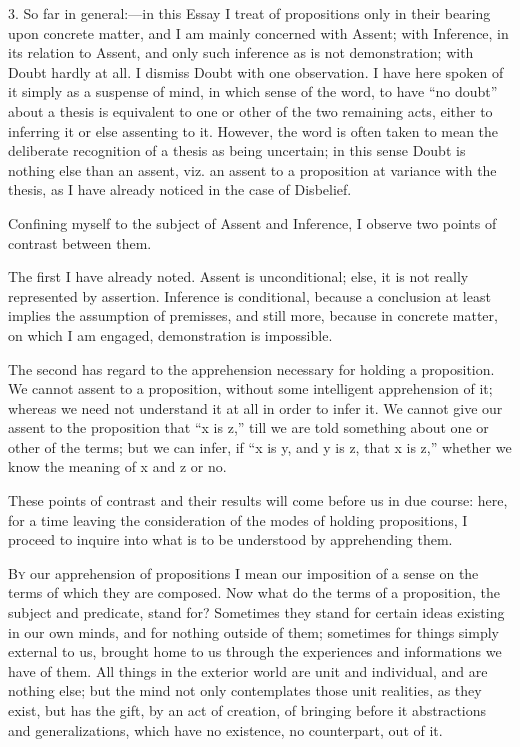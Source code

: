 3. So far in general:—in this Essay I treat of propositions only
in their bearing upon concrete matter, and I am mainly concerned with
Assent; with Inference, in its relation to Assent, and only such
inference as is not demonstration; with Doubt hardly at all. I dismiss
Doubt with one observation. I have here spoken of it simply as a
suspense of mind, in which sense of the word, to have ``no
doubt'' about a thesis is equivalent to one or other of the two
remaining acts, either to inferring it or else assenting to it.
However, the word is often taken to mean the deliberate recognition of
a thesis as being uncertain; in this sense Doubt is nothing else
than an assent, viz. an assent to a proposition at variance with the
thesis, as I have already noticed in the case of Disbelief.

Confining myself to the subject of Assent and Inference, I observe
two points of contrast between them.

The first I have already noted. Assent is unconditional; else, it
is not really represented by assertion. Inference is conditional,
because a conclusion at least implies the assumption of premisses, and
still more, because in concrete matter, on which I am engaged,
demonstration is impossible.

The second has regard to the apprehension necessary for holding a
proposition. We cannot assent to a proposition, without some
intelligent apprehension of it; whereas we need not understand it at
all in order to infer it. We cannot give our assent to the proposition
that ``x is z,'' till we are told something about one or other
of the terms; but we can infer, if ``x is y, and y is z, that x is
z,'' whether we know the meaning of x and z or no.

These points of contrast and their results will come before us in
due course: here, for a time leaving the consideration of the modes of
holding propositions, I proceed to inquire into what is to be
understood by apprehending them.


B\textsc{y} our apprehension of propositions I mean our imposition of a
sense on the terms of which they are composed. Now what do the terms
of a proposition, the subject and predicate, stand for? Sometimes they
stand for certain ideas existing in our own minds, and for nothing
outside of them; sometimes for things simply external to us, brought
home to us through the experiences and informations we have of them.
All things in the exterior world are unit and individual, and are
nothing else; but the mind not only contemplates those unit realities,
as they exist, but has the gift, by an act of creation, of bringing
before it abstractions and generalizations, which have no existence,
no counterpart, out of it.

